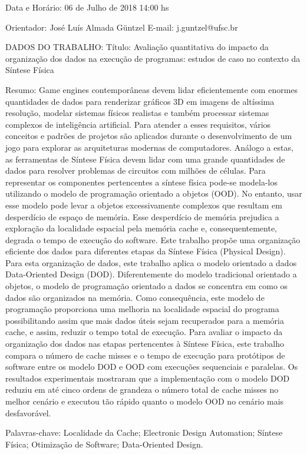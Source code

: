 Data e Horário:
06 de Julho de 2018
14:00 hs

Orientador:
José Luís Almada Güntzel
E-mail:
j.guntzel@ufsc.br

DADOS DO TRABALHO:
Título: 
Avaliação quantitativa do impacto da organização dos dados na execução de programas: estudos de caso no contexto da Síntese Física

Resumo:
Game engines contemporâneas devem lidar eficientemente com enormes quantidades de dados para renderizar gráficos 3D em imagens de altíssima resolução, modelar sistemas físicos realistas e também processar sistemas complexos de inteligência artificial. Para atender a esses requisitos, vários conceitos e padrões de projetos são aplicados durante o desenvolvimento de um jogo para explorar as arquiteturas modernas de computadores. Análogo a estas, as ferramentas de Síntese Física  devem lidar com uma grande quantidades de dados para resolver problemas de circuitos com milhões de células. Para representar os componentes pertencentes a síntese física pode-se modela-los utilizando o modelo de programação orientado a objetos (OOD). No entanto, usar esse modelo pode levar a objetos excessivamente complexos que resultam em desperdício de espaço de memória. Esse desperdício de memória prejudica a exploração da localidade espacial pela memória cache e, consequentemente, degrada o tempo de execução do software. Este trabalho propõe uma organização eficiente dos dados para diferentes etapas da Síntese Física (Physical Design). Para esta organização de dados, este trabalho aplica o modelo orientado a dados Data-Oriented Design (DOD). Diferentemente do modelo tradicional orientado a objetos, o modelo de programação orientado a dados se concentra em como os dados são organizados na memória. Como consequência, este modelo de programação proporciona uma melhoria na localidade espacial do programa possibilitando assim que mais dados úteis sejam recuperados para a memória cache, e assim, reduzir o tempo total de execução. Para avaliar o impacto da organização dos dados nas etapas pertencentes à Síntese Física, este trabalho compara o número de cache misses e o tempo de execução para protótipos de software entre os modelo DOD e OOD com execuções sequenciais e paralelas. Os resultados experimentais mostraram que a implementação com o modelo DOD reduziu em até cinco ordens de grandeza o número total de cache misses no melhor cenário e executou tão rápido quanto o modelo OOD no cenário mais desfavorável.

Palavras-chave:
Localidade da Cache; Electronic Design Automation; Síntese Física; Otimização de Software; Data-Oriented Design.

